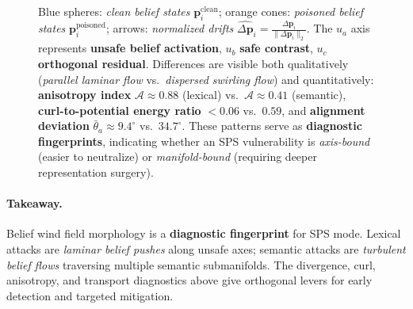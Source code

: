 \documentclass[11pt]{article}
\begin{document}
\begin{figure}[t]
{    Blue spheres: \textit{clean belief states} $\mathbf{p}^{\mathrm{clean}}_i$; orange cones: \textit{poisoned belief states} $\mathbf{p}^{\mathrm{poisoned}}_i$; arrows: \textit{normalized drifts} $\widehat{\Delta \mathbf{p}}_i = \frac{\Delta \mathbf{p}_i}{\|\Delta \mathbf{p}_i\|_2}$.  
    The $u_a$ axis represents \textbf{unsafe belief activation}, $u_b$ \textbf{safe contrast}, $u_c$ \textbf{orthogonal residual}.  
    Differences are visible both qualitatively (\textit{parallel laminar flow} vs.\ \textit{dispersed swirling flow}) and quantitatively: \textbf{anisotropy index} $\mathcal{A}\approx 0.88$ (lexical) vs.\ $\mathcal{A}\approx 0.41$ (semantic), \textbf{curl-to-potential energy ratio} $<0.06$ vs.\ $0.59$, and \textbf{alignment deviation} $\bar{\theta}_a \approx 9.4^\circ$ vs.\ $34.7^\circ$.  
    These patterns serve as \textbf{diagnostic fingerprints}, indicating whether an SPS vulnerability is \emph{axis-bound} (easier to neutralize) or \emph{manifold-bound} (requiring deeper representation surgery).}
\end{figure}


\paragraph{Takeaway.}
Belief wind field morphology is a \textbf{diagnostic fingerprint} for SPS mode. Lexical attacks are \textit{laminar belief pushes} along unsafe axes; semantic attacks are \textit{turbulent belief flows} traversing multiple semantic submanifolds. The divergence, curl, anisotropy, and transport diagnostics above give orthogonal levers for early detection and targeted mitigation.
\end{document}
